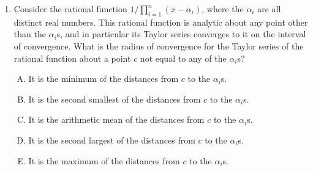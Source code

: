 \documentclass[10pt]{amsart}
\begin{document}
\begin{enumerate}
  {\em Answer}: Option (D)

  {\em Explanation}: The reciprocal $1/(x^2 + 1)$ is a rational
  function all of whose derivatives are rational functions with
  denominator a power of $x^2 + 1$, hence defined and continuous
  derivatives. Hence it is is $C^\infty(\R)$. Further, the power
  series expansion for it is like a geometric series, which has radius
  of convergence $1$, hence it is not globally analytic.

  {\em Why the other options are wrong}:

  Options (A) and (B): The reciprocals are not in $C^\infty(\R)$
  because the functions $1/x$ and $1/x^2$ are not defined or
  continuous at $0$.

  Option (C): The reciprocal is not in $C^\infty(\R)$ because the
  function $1/(x + 1)$ is not defined or continuous at $-1$.

  Option (E): The reciprocal, which is $\exp(-x)$, is globally
  analytic.

  {\em Performance review}: $9$ out of $11$ got this correct. $1$ each
  chose (A) and (E).

  {\em Historical note (last year)}: $10$ out of $26$ people got this
  correct. $5$ chose (C), $4$ each chose (A) and (E), $2$ chose (B),
  $1$ left the question blank.

\item Consider the rational function $1/\prod_{i=1}^n (x - \alpha_i)$,
  where the $\alpha_i$ are all distinct real numbers. This rational
  function is analytic about any point other than the $\alpha_i$s, and
  in particular its Taylor series converges to it on the interval of
  convergence. What is the radius of convergence for the Taylor series
  of the rational function about a point $c$ not equal to any of the
  $\alpha_i$s?

  \begin{enumerate}[(A)]
  \item It is the minimum of the distances from $c$ to the $\alpha_i$s.
  \item It is the second smallest of the distances from $c$ to the
    $\alpha_i$s.
  \item It is the arithmetic mean of the distances from $c$ to the $\alpha_i$s.
  \item It is the second largest of the distances from $c$ to the
    $\alpha_i$s.
  \item It is the maximum of the distances from $c$ to the $\alpha_i$s.
  \end{enumerate}


\end{enumerate}
\end{document}
